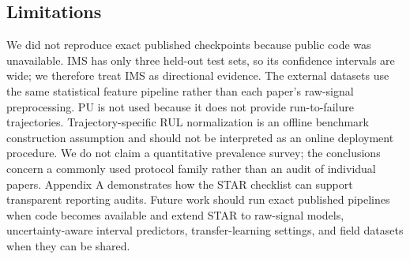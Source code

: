 \documentclass[pdflatex,sn-mathphys-num]{sn-jnl}
\begin{document}
\begin{table}[t]
\centering
\caption{Conventional reporting patterns versus STAR requirements.}
\label{tab:star_before_after}
\small
{}
\end{table}

\subsection{Limitations}
We did not reproduce exact published checkpoints because public code was unavailable. IMS has only three held-out test sets, so its confidence intervals are wide; we therefore treat IMS as directional evidence. The external datasets use the same statistical feature pipeline rather than each paper's raw-signal preprocessing. PU is not used because it does not provide run-to-failure trajectories. Trajectory-specific RUL normalization is an offline benchmark construction assumption and should not be interpreted as an online deployment procedure. We do not claim a quantitative prevalence survey; the conclusions concern a commonly used protocol family rather than an audit of individual papers. Appendix A demonstrates how the STAR checklist can support transparent reporting audits. Future work should run exact published pipelines when code becomes available and extend STAR to raw-signal models, uncertainty-aware interval predictors, transfer-learning settings, and field datasets when they can be shared.
\end{document}
